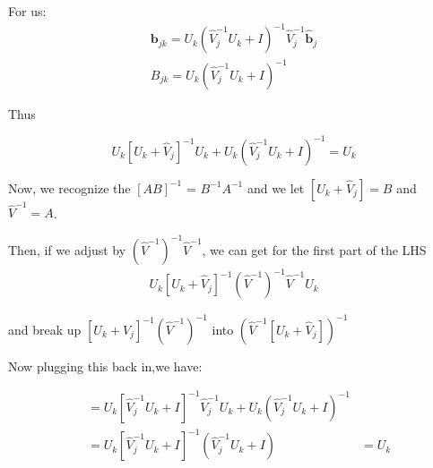 \documentclass[11pt, oneside]{article}   	%
\begin{document}
For us:
\begin{equation}
  \begin{aligned}
    \bm{b}_{jk}= U_{k} \left( \hat{V}_{j}^{-1} U_{k} + I \right)^{-1} \hat{V}_{j}^{-1} \hat{\bm{b}}_{j}\\
    B_{jk} = U_{k} \left( \hat{V}_{j}^{-1} U_{k} + I \right)^{-1}
    \end{aligned}
\end{equation}


Thus

\begin{equation}
U_{k}[U_{k}+\hat{V}_{j}]^{-1}U_{k} + U_{k} \left( \hat{V}_{j}^{-1} U_{k} + I \right)^{-1} = U_{k}
\end{equation}

Now, we recognize the $[AB]^{-1}$ = $B^{-1}A^{-1}$ and we let $[U_{k}+\hat{V}_{j}] = B$ and $\hat{V}^{-1} = A$.

Then, if we adjust by $(\hat{V}^{-1})^{-1}\hat{V}^{-1}$, we can get  for the first part of the LHS
\begin{equation}
  \begin{aligned}
U_{k}[U_{k}+\hat{V}_{j}]^{-1}(\hat{V}^{-1})^{-1}\hat{V}^{-1}U_{k}
  \end{aligned}
\end{equation}

and break up $[U_{k}+\hat{V}_{j}]^{-1}(\hat{V}^{-1})^{-1}$
into $(\hat{V}^{-1} [U_{k}+\hat{V}_{j}] )^{-1}$

 Now plugging this back in,we have:
  
\begin{equation}
  \begin{aligned}
&=U_{k}[\hat{V}_{j}^{-1}U_{k}+I]^{-1} \hat{V}_{j}^{-1} U_{k} + U_{k} \left( \hat{V}_{j}^{-1} U_{k} + I \right)^{-1} \\
&= U_{k}[\hat{V}_{j}^{-1}U_{k}+I]^{-1}(\hat{V}_{j}^{-1} U_{k} + I )
&=U_{k}
\end{aligned}
\end{equation}
\end{document}
